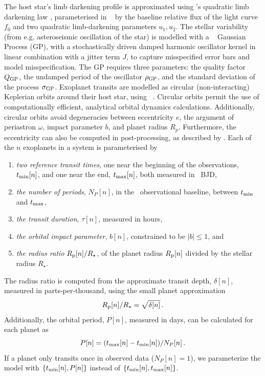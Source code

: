\documentclass[floatfix,ApJL,twocolumn]{aastex631}
\begin{document}
The host star's limb darkening profile is approximated using \citet{Kipping:2013:MNRAS}'s quadratic limb darkening law \citep{Claret:2000:A&A, Mandel:2002:ApJL}, parameterised in \starry~\citep{Luger:2019:AJ} by the baseline relative flux of the light curve $f_0$ and two quadratic limb-darkening parameters $u_1, u_2$.
The stellar variability (from e.g. asteroseismic oscillation of the star) is modelled with a \celerite~\citep{Foreman-Mackey:2017:ascl} Gaussian Process (GP), with a stochastically driven damped harmonic oscillator kernel in linear combination with a jitter term $J$, to capture misspecified error bars and model misspecification.
The GP requires three parameters: the quality factor $Q_{\rm GP}$, the undamped period of the oscillator $\rho_{\rm GP}$, and the standard deviation of the process $\sigma_{\rm GP}$. 
Exoplanet transits are modelled as circular (non-interacting) Keplerian orbits around their host star, using \exoplanet~\citep{Foreman-Mackey:2021:JOSS}. 
Circular orbits permit the use of computationally efficient, analytical orbital dynamics calculations.
Additionally, circular orbits avoid degeneracies between eccentricity $e$, the argument of periastron $\omega$, impact parameter $b$, and planet radius $R_p$. 
Furthermore, the eccentricity can also be computed in post-processing, as described by \citet{Dawson:2012:ApJ}.
Each of the $n$ exoplanets in a system is parameterised by
\begin{enumerate}
  \item \emph{two reference transit times}, one near the beginning of the observations, $\operatorname{\mathnormal{t_{\rm min}}}[n]$, and one near the end, $\operatorname{\mathnormal{t_{\rm max}}}[n]$, both measured in \tess\ BJD,
  \item \emph{the number of periods}, $N_P[n]$, in the \tess\ observational baseline, between $\operatorname{\mathnormal{t_{\rm min}}}$ and $\operatorname{\mathnormal{t_{\rm max}}}$,
  \item \emph{the transit duration}, $\tau[n]$, measured in hours,
  \item \emph{the orbital impact parameter}, $b[n]$, constrained to be $|b| \le 1$, and
    \item \emph{the radius ratio} $R_{\rm p}[n] / R_\star$, of the planet radius $R_{\rm p}[n]$ divided by the stellar radius $R_\star$.
\end{enumerate}
The radius ratio is computed from the approximate transit depth, $\delta[n]$, measured in parts-per-thousand, using the small planet approximation
\begin{equation}
    R_{\rm p}[n]/R_{\star} = \sqrt{\delta[n]}\, .
\end{equation}
Additionally, the orbital period, $P[n]$, measured in days, can be calculated for each planet as 
\begin{equation}
  P[n] =  (\tmax[n] - \tmin[n]) / N_P[n]\, .
\end{equation}
If a planet only transits once in observed data ($N_P[n]=1$), we parameterize the model with $\{\operatorname{\mathnormal{t_{\rm min}}}[n], P[n]\}$ instead of $\{ \operatorname{\mathnormal{t_{\rm min}}}[n], \operatorname{\mathnormal{t_{\rm max}}}[n]\}$. 
\end{document}
